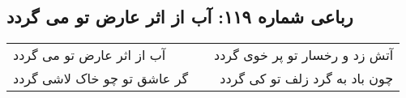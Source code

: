 \begin{center}
\section*{رباعی شماره ۱۱۹: آب از اثر عارض تو می گردد}
\label{sec:sh119}
\begin{longtable}{l p{0.5cm} r}
آب از اثر عارض تو می گردد
&&
آتش زد و رخسار تو پر خوی گردد
\\
گر عاشق تو چو خاک لاشی گردد
&&
چون باد به گرد زلف تو کی گردد
\\
\end{longtable}
\end{center}

